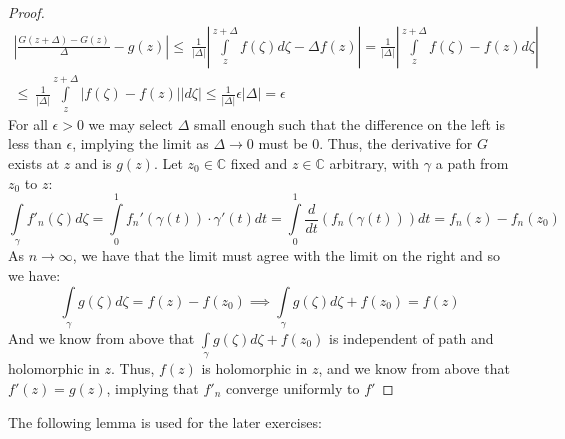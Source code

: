 \documentclass{article}
\newcommand{\bb}[1]{\mathbb{#1}}
\begin{document}
\begin{proof}
  \begin{align*}
    \left| \frac{G(z + \Delta) - G(z)}{\Delta} - g(z) \right | \leq  \ \frac{1}{|\Delta|}\left|\int\limits_{z}^{z+\Delta}f(\zeta) d\zeta - \Delta f(z) \right | = \frac{1}{|\Delta|}\left|\int\limits_{z}^{z+\Delta}f(\zeta) - f(z)d\zeta \right| \\
    \leq \  \frac{1}{|\Delta|}\int\limits_{z}^{z+\Delta}|f(\zeta)-f(z)| |d\zeta| \leq \frac{1}{|\Delta|}\epsilon|\Delta| = \epsilon
  \end{align*}
  For all $\epsilon > 0$ we may select $\Delta$ small enough such that the difference on the left is less than $\epsilon$, implying the limit as $\Delta \to 0$ must be $0$. Thus, the derivative for $G$ exists at $z$ and is $g(z)$. Let $z_{0}\in \bb{C}$ fixed and $z \in \bb{C}$ arbitrary, with $\gamma$ a path from $z_{0}$ to $z$:
  \[
    \int\limits_{\gamma}f'_{n}(\zeta)d\zeta = \int\limits_{0}^{1}f_{n}'(\gamma(t))\cdot\gamma'(t)dt = \int\limits_{0}^{1}\frac{d}{dt}(f_{n}(\gamma(t)))dt = f_{n}(z) - f_{n}(z_{0})
  \]
  As $n \to \infty$, we have that the limit must agree with the limit on the right and so we have:
  \[
    \int\limits_{\gamma}g(\zeta)d\zeta = f(z) - f(z_{0}) \implies \int\limits_{\gamma}g(\zeta)d\zeta +f(z_{0}) = f(z) 
  \]
  And we know from above that $\int\limits_{\gamma}g(\zeta)d\zeta +f(z_{0})$ is independent of path and holomorphic in $z$. Thus, $f(z)$ is holomorphic in $z$, and we know from above that $f'(z) = g(z)$, implying that $f'_{n}$ converge uniformly to $f'$
\end{proof}


The following lemma is used for the later exercises: \\
\end{document}
